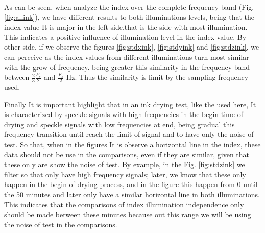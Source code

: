 \documentclass[review]{elsarticle}
\begin{document}
As can be seen, when analyze the index over the complete frequency band (Fig. \ref{fig:allink}),
we have different results to both illuminations levels, being that the index
value It is major in the left side,that is the side with most illumination. This 
indicates a positive influence of illumination level in the index value.
By other side, if we observe the figures \ref{fig:stdxink}, \ref{fig:stdyink} and \ref{fig:stdzink},
we can perceive as the index values from different
illuminations  turn most similar with the grow of frequency.
being greater this similarity in the frequency band between $\frac{2}{3}\frac{F_s}{2}$ and $\frac{F_s}{2}$ Hz.
Thus the similarity is limit by the sampling frequency used.

Finally It is important highlight that in an ink drying test, like the used here,
It is characterized by speckle signals with high frequencies in the begin time
of drying and  speckle signals with low frequencies at end, being gradual this frequency transition
until reach the limit of signal and to have only the noise of test.
So that, when in the figures It is observe a horizontal line in the index, these data
should not be use in the comparisons, even if they are similar, given that these
only are show the noise of test. By example, in the Fig. \ref{fig:stdzink}
we filter so that only have high frequency signals; later, we know that these only happen
in the begin of drying process, and in the figure this happen from 0 until
the 50 minutes and later only have a similar horizontal line in both illuminations.
This indicates that the comparisons of index illumination independence
only should be made between these minutes because out this range we will be using
the noise of test in the comparisons.
\end{document}
